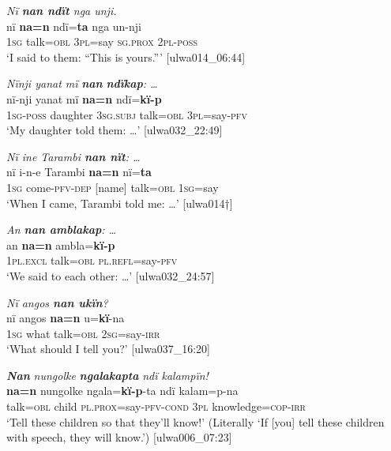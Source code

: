 \ea%
    \label{ex:syntax:193}
          \textit{Nï \textbf{nan ndït} nga unji.}\\
\gll    nï    \textbf{na=n}    ndï=\textbf{ta}    nga      un-nji\\
    1\textsc{sg}  talk=\textsc{obl}  3\textsc{pl}=say  \textsc{sg.prox}  \textsc{2pl-poss}\\
\glt `I said to them: “This is yours.”’ [ulwa014\_06:44]
\z

\ea%
    \label{ex:syntax:194}
          \textit{Nïnji yanat mï} \textbf{\textit{nan}} \textbf{\textit{ndïkap}}\textit{: …}\\
\gll    nï-nji    yanat    mï      \textbf{na=n}    ndï=\textbf{kï-p}\\
    1\textsc{sg-poss}  daughter  \textsc{3sg.subj}  talk=\textsc{obl}  \textsc{3pl=}say-\textsc{pfv}\\
\glt `My daughter told them: …’ [ulwa032\_22:49]
\z

\ea%
    \label{ex:syntax:195}
          \textit{Nï ine Tarambi \textbf{nan nït}: …}\\
\gll    nï    i-n-e        Tarambi  \textbf{na=n}    nï=\textbf{ta}\\
    \textsc{1sg}  come-\textsc{pfv-dep}    [name]    talk=\textsc{obl}  1\textsc{sg}=say\\
\glt `When I came, Tarambi told me: …’ [ulwa014†]
\z

\ea%
    \label{ex:syntax:196}
          \textit{An \textbf{nan amblakap}: …}\\
\gll    an      \textbf{na=n}    ambla=\textbf{kï-p}\\
    1\textsc{pl.excl}  talk=\textsc{obl}  \textsc{pl.refl}=say-\textsc{pfv}\\
\glt `We said to each other: …’ [ulwa032\_24:57]
\z

\ea%
    \label{ex:syntax:197}
          \textit{Nï angos \textbf{nan ukïn}?}\\
\gll nï    angos  \textbf{na=n}    u=\textbf{kï}{}-na\\
    1\textsc{sg}  what  talk=\textsc{obl}  2\textsc{sg}=say-\textsc{irr}\\
\glt `What should I tell you?’ [ulwa037\_16:20]
\z

\ea%
    \label{ex:syntax:198}
          \textbf{\textit{Nan}} \textit{nungolke} \textbf{\textit{ngalakapta}} \textit{ndï kalampïn!}\\
\gll    \textbf{na=n}    nungolke  ngala=\textbf{kï-p}{}-ta        ndï     kalam=p-na\\
    talk=\textsc{obl}  child    \textsc{pl.prox}=say-\textsc{pfv-cond}  \textsc{3pl}    knowledge=\textsc{cop}{}-\textsc{irr}\\
\glt `Tell these children so that they’ll know!’ (Literally ‘If [you] tell these children with speech, they will know.’) [ulwa006\_07:23]
\z

